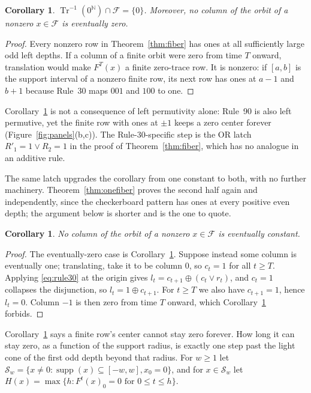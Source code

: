 \documentclass[11pt]{article}
\newtheorem{corollary}[theorem]{Corollary}
\theoremstyle{definition}
\newcommand{\F}{\mathcal F}
\newcommand{\Tr}{\operatorname{Tr}}
\newcommand{\supp}{\operatorname{supp}}
\begin{document}
\begin{corollary}\label{cor:finite}
$\Tr^{-1}(0^{\mathbb N})\cap\F=\{0\}$. Moreover, no column of the orbit of a
nonzero $x\in\F$ is eventually zero.
\end{corollary}
\begin{proof}
Every nonzero row in Theorem~\ref{thm:fiber} has ones at all sufficiently large
odd left depths. If a column of a finite orbit were zero from time $T$ onward,
translation would make $F^T(x)$ a finite zero-trace row. It is nonzero: if
$[a,b]$ is the support interval of a nonzero finite row, its next row has ones
at $a-1$ and $b+1$ because Rule~30 maps $001$ and $100$ to one.
\end{proof}

Corollary~\ref{cor:finite} is not a consequence of left permutivity alone:
Rule~90 is also left permutive, yet the finite row with ones at $\pm1$ keeps a
zero center forever (Figure~\ref{fig:panels}(b,c)). The Rule-30-specific step
is the OR latch $R'_1=1\lor R_2=1$ in the proof of Theorem~\ref{thm:fiber},
which has no analogue in an additive rule.

The same latch upgrades the corollary from one constant to both, with no
further machinery. Theorem~\ref{thm:onefiber} proves the second half again and
independently, since the checkerboard pattern has ones at every positive even
depth; the argument below is shorter and is the one to quote.

\begin{corollary}\label{cor:constant}
No column of the orbit of a nonzero $x\in\F$ is eventually constant.
\end{corollary}
\begin{proof}
The eventually-zero case is Corollary~\ref{cor:finite}. Suppose instead some
column is eventually one; translating, take it to be column $0$, so $c_t=1$
for all $t\ge T$. Applying \eqref{eq:rule30} at the origin gives
$l_t=c_{t+1}\oplus(c_t\lor r_t)$, and $c_t=1$ collapses the disjunction, so
$l_t=1\oplus c_{t+1}$. For $t\ge T$ we also have $c_{t+1}=1$, hence $l_t=0$.
Column $-1$ is then zero from time $T$ onward, which Corollary~\ref{cor:finite}
forbids.
\end{proof}

Corollary~\ref{cor:finite} says a finite row's center cannot stay zero forever.
How long it can stay zero, as a function of the support radius, is exactly one
step past the light cone of the first odd depth beyond that radius. For $w\ge1$
let $\mathcal S_w=\{x\ne0:\supp(x)\subseteq[-w,w],x_0=0\}$, and for
$x\in\mathcal S_w$ let $H(x)=\max\{h:F^t(x)_0=0\text{ for }0\le t\le h\}$.
\end{document}
